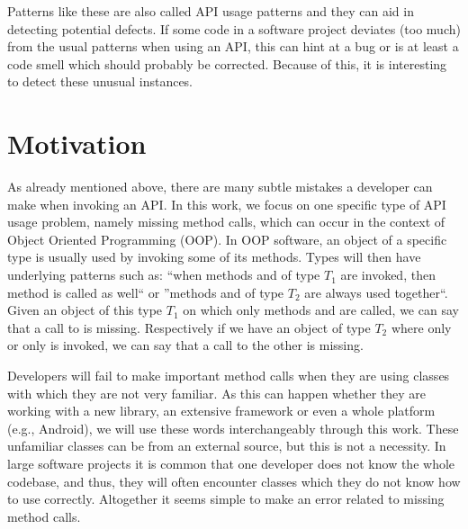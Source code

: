 Patterns like these are also called API usage patterns \cite{robillard2013automated} and they can aid in detecting potential defects.
If some code in a software project deviates (too much) from the usual patterns when using an API, this can hint at a bug or is at least a code smell which should probably be corrected.
Because of this, it is interesting to detect these unusual instances.

\section{Motivation}


As already mentioned above, there are many subtle mistakes a developer can make when invoking an API.
In this work, we focus on one specific type of API usage problem, namely missing method calls, which can occur in the context of Object Oriented Programming (OOP).
In OOP software, an object of a specific type is usually used by invoking some of its methods.
Types will then have underlying patterns such as: ``when methods  and  of type $T_1$ are invoked, then method  is called as well`` or ''methods  and  of type $T_2$ are always used together``.
Given an object of this type $T_1$ on which only methods  and  are called, we can say that a call to  is missing.
Respectively if we have an object of type $T_2$ where only  or only  is invoked, we can say that a call to the other is missing.

Developers will fail to make important method calls when they are using classes with which they are not very familiar.
As this can happen whether they are working with a new library, an extensive framework or even a whole platform (e.g., Android), we will use these words interchangeably through this work.
These unfamiliar classes can be from an external source, but this is not a necessity.
In large software projects it is common that one developer does not know the whole codebase, and thus, they will often encounter classes which they do not know how to use correctly.
Altogether it seems simple to make an error related to missing method calls. 


